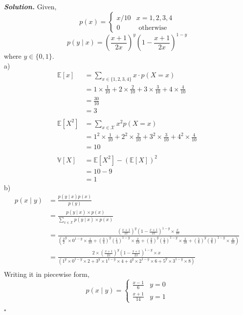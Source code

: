 \documentclass[11pt]{amsart}
\newenvironment{solution}[1][\it{Solution}]{\textbf{#1. } }{$\square$}
\theoremstyle{definition}
\begin{document}
\begin{solution}
Given,
$$
p(x)=\left\{\begin{array}{ll}
x / 10 & x=1,2,3,4 \\
0 & \text { otherwise }
\end{array}\right.
$$
$$
p(y \mid x)=\left(\frac{x+1}{2 x}\right)^{y}\left(1-\frac{x+1}{2 x}\right)^{1-y}
$$
where $y \in\{0,1\}$.\\
a)
\begin{align*}
\mathbb{E}[x] &=\sum_{x \in\{1,2,3,4\}} x \cdot p(X=x) \\
&=1 \times \frac{1}{10}+2 \times \frac{2}{10}+3 \times \frac{3}{10}+4 \times \frac{4}{10} \\
&=\frac{30}{10}\\
&=\boxed{3}\\\\
\mathbb{E}\left[X^{2}\right] &=\sum_{x \in \mathcal{X}} x^{2} p(X=x) \\
&=1^{2} \times \frac{1}{10}+2^{2} \times \frac{2}{10}+3^{2} \times \frac{3}{10}+4^{2}\times\frac{4}{10}\\
&=10\\\\
\mathbb{V}\left[X\right] &= \mathbb{E}\left[X^{2}\right] - \left(\mathbb{E}\left[X\right]\right)^{2}\\
&= 10 - 9\\
&= \boxed{1}
\end{align*}
b)
\begin{align*}
p(x \mid y)&=\frac{p(y \mid x) p(x)}{p(y)}\\
&=\frac{p(y \mid x) \times p(x)}{\sum_{x \in \mathcal{X}} p(y \mid x) \times p(x)}\\
&=\frac{\left(\frac{x+1}{2 x}\right)^{y}\left(1-\frac{x+1}{2 x}\right)^{1-y} \times \frac{x}{10}}{\left({\frac{2}{2}}^{y} \times 0^{1-y} \times \frac{1}{10}+\left(\frac{3}{4}\right)^{y}\left(\frac{1}{4}\right)^{1-y}\times\frac{2}{10}+\left(\frac{2}{3}\right)^{y}\left(\frac{1}{3}\right)^{1-y}\times\frac{3}{10}+\left(\frac{5}{8}\right)^{y}\left(\frac{3}{8}\right)^{1-y}\times\frac{4}{10}\right)}\\
&=\frac{2 \times \left(\frac{x+1}{2 x}\right)^{y}\left(1-\frac{x+1}{2 x}\right)^{1-y} \times x}{\left(1^{y} \times 0^{1-y} \times 2+3^{y}\times1^{1-y}\times4+4^{y}\times2^{1-y}\times6+5^{y}\times3^{1-y}\times8\right)}\\
\end{align*}
Writing it in piecewise form,
$$
p(x \mid y)=\left\{\begin{array}{ll}
\frac{x-1}{6} & y=0 \\
\frac{x+1}{14} & y=1
\end{array}\right.
$$


\end{solution}
\end{document}

